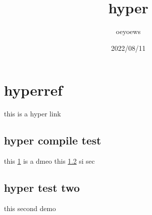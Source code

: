 \documentclass[UTF8]{article}
\title{hyper}
\author{oeyoews}
\date{2022/08/11}
\begin{document}
\maketitle

\section{hyperref}%
\label{sec:hyperref}
this is a hyper link


\subsection{hyper compile test}%
\label{sec:hyper compile test}

this \ref{sec:hyperref} is a dmeo
this \ref{sec:demo} si sec

\newpage

\subsection{hyper test two}%
\label{sec:demo}

this second \pageref{sec:hyperref} demo
\end{document}
